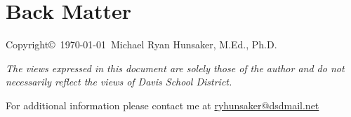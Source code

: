 \chapter*{Back Matter}
\vfill
Copyright\copyright\ \today\ Michael Ryan Hunsaker, M.Ed., Ph.D.

\emph{The views expressed in this document are solely those of the author and do not necessarily reflect the views of Davis School District.}

For additional information please contact me at \href{mailto:ryhunsaker@dsdmail.net}{ryhunsaker@dsdmail.net}
